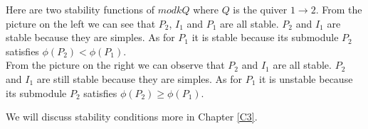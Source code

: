 \begin{example}
\indent Here are two stability functions of $mod kQ$ where $Q$ is the quiver $1\to 2$. From the picture on the left we can see that $P_2$, $I_1$ and $P_1$ are all stable. $P_2$ and $I_1$ are stable because they are simples. As for $P_1$ it is stable because its submodule $P_2$ satisfies $\phi(P_2)<\phi(P_1)$.\\
From the picture on the right we can observe that $P_2$ and $I_1$ are all stable. $P_2$ and $I_1$ are still stable because they are simples. As for $P_1$ it is unstable because its submodule $P_2$ satisfies $\phi(P_2)\geq \phi(P_1)$.\\
\end{example}
\indent We will discuss stability conditions more in Chapter \ref{C3}.
